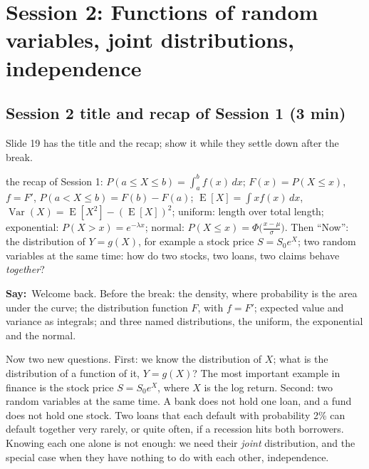 \documentclass[11pt,a4paper,parskip=half]{scrartcl}
\newcommand{\E}{\operatorname{E}}
\newcommand{\Var}{\operatorname{Var}}
\newcommand{\say}{\textbf{\color{teal}Say:}\ }
\begin{document}
\section{Session 2: Functions of random variables, joint distributions,
  independence}

\begin{printskip}
	\subsection{Session 2 title and recap of Session 1 (3 min)}

	\begin{slidecue}
		Slide 19 has the title and the recap; show it while they settle down
		after the break.
	\end{slidecue}

	\begin{onslide}
		the recap of Session 1: $P(a\le X\le b)=\int_a^b f(x)\,dx$;
		$F(x)=P(X\le x)$, $f=F'$, $P(a<X\le b)=F(b)-F(a)$;
		$\E[X]=\int x f(x)\,dx$, $\Var(X)=\E[X^2]-(\E[X])^2$; uniform: length
		over total length; exponential: $P(X>x)=e^{-\lambda x}$; normal:
		$P(X\le x)=\Phi\big(\frac{x-\mu}{\sigma}\big)$. Then ``Now'': the
		distribution of $Y=g(X)$, for example a stock price $S=S_0e^X$; two
		random variables at the same time: how do two stocks, two loans, two
		claims behave \emph{together}?
	\end{onslide}

	\say Welcome back. Before the break: the density, where probability is
	the area under the curve; the distribution function $F$, with $f=F'$;
	expected value and variance as integrals; and three named distributions,
	the uniform, the exponential and the normal.

	Now two new questions. First: we know the distribution of $X$; what is
	the distribution of a function of it, $Y=g(X)$? The most important
	example in finance is the stock price $S=S_0e^X$, where $X$ is the log
	return. Second: two random variables at the same time. A bank does not
	hold one loan, and a fund does not hold one stock. Two loans that each
	default with probability 2\% can default together very rarely, or quite
	often, if a recession hits both borrowers. Knowing each one alone is not
	enough: we need their \emph{joint} distribution, and the special case
	when they have nothing to do with each other, independence.
\end{printskip}
\end{document}
